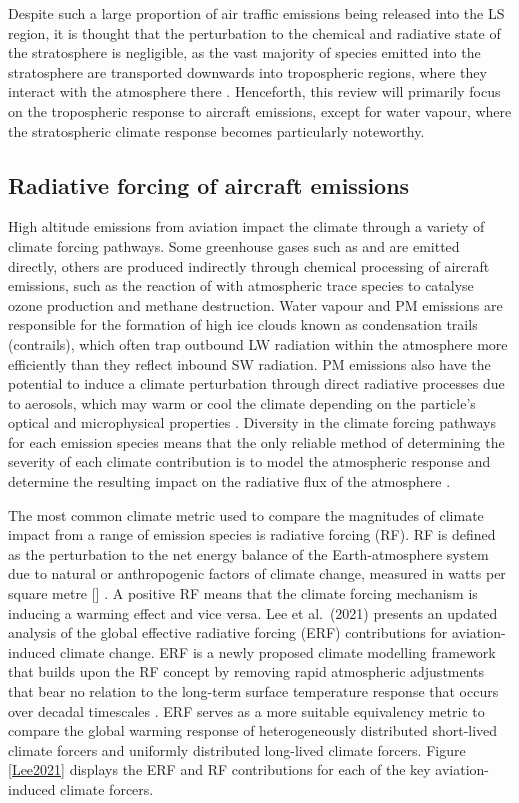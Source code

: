 Despite such a large proportion of air traffic emissions being released into the LS region, it is thought that the perturbation to the chemical and radiative state of the stratosphere is negligible, as the vast majority of species emitted into the stratosphere are transported downwards into tropospheric regions, where they interact with the atmosphere there \cite{Lee2010, Grewe2002, Forster2003}. Henceforth, this review will primarily focus on the tropospheric response to aircraft emissions, except for water vapour, where the stratospheric climate response becomes particularly noteworthy.

\subsection{Radiative forcing of aircraft emissions}
High altitude emissions from aviation impact the climate through a variety of climate forcing pathways. Some greenhouse gases such as  and  are emitted directly, others are produced indirectly through chemical processing of aircraft emissions, such as the reaction of  with atmospheric trace species to catalyse ozone production and methane destruction. Water vapour and PM emissions are responsible for the formation of high ice clouds known as condensation trails (contrails), which often trap outbound LW radiation within the atmosphere more efficiently than they reflect inbound SW radiation. PM emissions also have the potential to induce a climate perturbation through direct radiative processes due to aerosols, which may warm or cool the climate depending on the particle's optical and microphysical properties \cite{Lee2010}. Diversity in the climate forcing pathways for each emission species means that the only reliable method of determining the severity of each climate contribution is to model the atmospheric response and determine the resulting impact on the radiative flux of the atmosphere \cite{Brasseur1998}.

The most common climate metric used to compare the magnitudes of climate impact from a range of emission species is radiative forcing (RF). RF is defined as the perturbation to the net energy balance of the Earth-atmosphere system due to natural or anthropogenic factors of climate change, measured in watts per square metre [] \cite{Fuglestvedt2003}. A positive RF means that the climate forcing mechanism is inducing a warming effect and vice versa. Lee et al.\ (2021) \cite{Lee2021} presents an updated analysis of the global effective radiative forcing (ERF) contributions for aviation-induced climate change. ERF is a newly proposed climate modelling framework that builds upon the RF concept by removing rapid atmospheric adjustments that bear no relation to the long-term surface temperature response that occurs over decadal timescales \cite{Myhre2013}. ERF serves as a more suitable equivalency metric to compare the global warming response of heterogeneously distributed short-lived climate forcers and uniformly distributed long-lived climate forcers. Figure \ref{Lee2021} displays the ERF and RF contributions for each of the key aviation-induced climate forcers.

